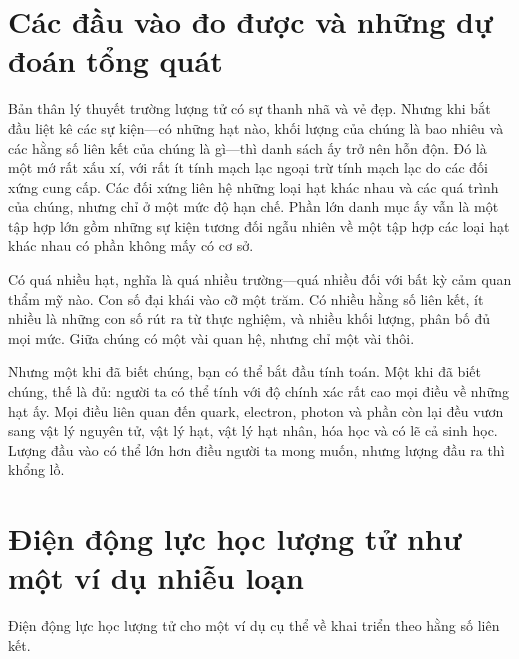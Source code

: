 \section{Các đầu vào đo được và những dự đoán tổng quát}

Bản thân lý thuyết trường lượng tử có sự thanh nhã và vẻ đẹp. Nhưng khi bắt đầu liệt kê các sự kiện---có những hạt nào, khối lượng của chúng là bao nhiêu và các hằng số liên kết của chúng là gì---thì danh sách ấy trở nên hỗn độn. Đó là một mớ rất xấu xí, với rất ít tính mạch lạc ngoại trừ tính mạch lạc do các đối xứng cung cấp. Các đối xứng liên hệ những loại hạt khác nhau và các quá trình của chúng, nhưng chỉ ở một mức độ hạn chế. Phần lớn danh mục ấy vẫn là một tập hợp lớn gồm những sự kiện tương đối ngẫu nhiên về một tập hợp các loại hạt khác nhau có phần không mấy có cơ sở.

\begin{classroomqa}
\end{classroomqa}

Có quá nhiều hạt, nghĩa là quá nhiều trường---quá nhiều đối với bất kỳ cảm quan thẩm mỹ nào. Con số đại khái vào cỡ một trăm. Có nhiều hằng số liên kết, ít nhiều là những con số rút ra từ thực nghiệm, và nhiều khối lượng, phân bố đủ mọi mức. Giữa chúng có một vài quan hệ, nhưng chỉ một vài thôi.

Nhưng một khi đã biết chúng, bạn có thể bắt đầu tính toán. Một khi đã biết chúng, thế là đủ: người ta có thể tính với độ chính xác rất cao mọi điều về những hạt ấy. Mọi điều liên quan đến quark, electron, photon và phần còn lại đều vươn sang vật lý nguyên tử, vật lý hạt, vật lý hạt nhân, hóa học và có lẽ cả sinh học. Lượng đầu vào có thể lớn hơn điều người ta mong muốn, nhưng lượng đầu ra thì khổng lồ.

\section{Điện động lực học lượng tử như một ví dụ nhiễu loạn}

Điện động lực học lượng tử cho một ví dụ cụ thể về khai triển theo hằng số liên kết.

\begin{classroomqa}
\end{classroomqa}

